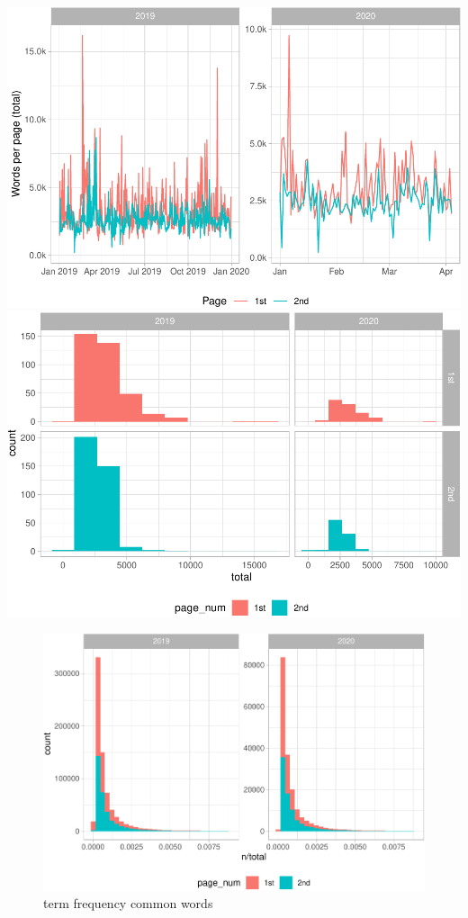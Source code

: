 \documentclass[
  12pt,
]{article}
\begin{document}
\includegraphics{text_analysis_files/figure-latex/unnamed-chunk-2-1.pdf} \includegraphics{text_analysis_files/figure-latex/unnamed-chunk-2-2.pdf}

\begin{figure}
\centering
\includegraphics{text_analysis_files/figure-latex/unnamed-chunk-3-1.pdf}
\caption{\label{fig:unnamed-chunk-3}term frequency common words}
\end{figure}
\end{document}
